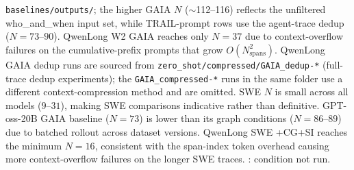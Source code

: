 \begin{table}[t]
{  \texttt{baselines/outputs/}; the higher GAIA $N$ ($\sim$112--116)
  reflects the unfiltered who\_and\_when input set, while TRAIL-prompt
  rows use the agent-trace dedup ($N{=}73$--$90$).
  QwenLong W2 GAIA reaches only $N{=}37$ due to context-overflow failures
  on the cumulative-prefix prompts that grow $O(N_{\text{spans}}^2)$.
  QwenLong GAIA dedup runs are sourced from \texttt{zero\_shot/compressed/GAIA\_dedup-*}
  (full-trace dedup experiments); the \texttt{GAIA\_compressed-*} runs
  in the same folder use a different context-compression method and are omitted.
  SWE $N$ is small across all models ($9$--$31$), making SWE comparisons
  indicative rather than definitive.
  GPT-oss-20B GAIA baseline ($N{=}73$) is lower than its graph conditions
  ($N{=}86$--$89$) due to batched rollout across dataset versions.
  QwenLong SWE +CG+SI reaches the minimum $N{=}16$, consistent with the
  span-index token overhead causing more context-overflow failures on the
  longer SWE traces.
  \text{---}: condition not run.%
}
\label{tab:trace_coverage_baseline}
\end{table}
